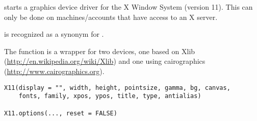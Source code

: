 %
\begin{Description}\relax
{} starts a graphics device driver for the X Window System
(version 11).  This can only be done on machines/accounts that have
access to an X server.

 is recognized as a synonym for .

The \R{} function is a wrapper for two devices, one based on Xlib
(\url{http://en.wikipedia.org/wiki/Xlib}) and one using cairographics
(\url{http://www.cairographics.org}).
\end{Description}
%
\begin{Usage}
\begin{verbatim}
X11(display = "", width, height, pointsize, gamma, bg, canvas,
    fonts, family, xpos, ypos, title, type, antialias)

X11.options(..., reset = FALSE)
\end{verbatim}
\end{Usage}
%
